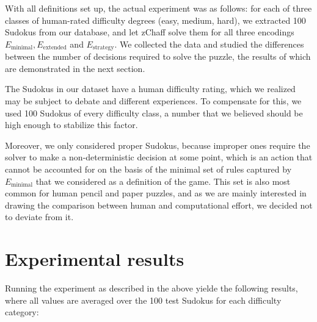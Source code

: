 \documentclass[10pt,a4paper,leqno]{article}
\begin{document}
With all definitions set up, the actual experiment was as follows: for each of three classes of human-rated difficulty degrees (easy, medium, hard), we extracted 100 Sudokus from our database, and let zChaff solve them for all three encodings $E_{\text{minimal}}, E_{\text{extended}} $ and $E_{\text{strategy}} $. We collected the data and studied the differences between the number of decisions required to solve the puzzle, the results of which are demonstrated in the next section. 

The Sudokus in our dataset have a human difficulty rating, which we realized may be subject to debate and different experiences. To compensate for this, we used 100 Sudokus of every difficulty class, a number that we believed should be high enough to stabilize this factor. 

Moreover, we only considered proper Sudokus, because improper ones require the solver to make a non-deterministic decision at some point, which is an action that cannot be accounted for on the basis of the minimal set of rules captured by $E_{\text{minimal}}$ that we considered as a definition of the game. This set is also most common for human pencil and paper puzzles, and as we are mainly interested in drawing the comparison between human and computational effort, we decided not to deviate from it. 


\section*{Experimental results}

 
Running the experiment as described in the above yielde the following results, where all values are averaged over the 100 test Sudokus for each difficulty category:
\end{document}
